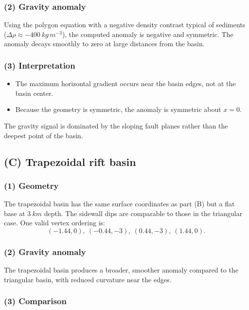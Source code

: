 \documentclass[11pt,a4paper]{article}
\begin{document}
\subsubsection*{(2) Gravity anomaly}

Using the polygon equation with a negative density contrast typical of sediments
($\Delta\rho \approx -400~\si{kg\,m^{-3}}$), the computed anomaly is negative and symmetric.
The anomaly decays smoothly to zero at large distances from the basin.

\subsubsection*{(3) Interpretation}

\begin{itemize}
    \item The maximum horizontal gradient occurs near the basin edges, not at the basin center.
    \item Because the geometry is symmetric, the anomaly is symmetric about $x=0$.
\end{itemize}

The gravity signal is dominated by the sloping fault planes rather than the deepest
point of the basin.

\subsection*{(C) Trapezoidal rift basin}

\subsubsection*{(1) Geometry}

The trapezoidal basin has the same surface coordinates as part (B) but a flat base
at $\SI{3}{km}$ depth. The sidewall dips are comparable to those in the triangular case.
One valid vertex ordering is:
\[
(-1.44,0),\ (-0.44,-3),\ (0.44,-3),\ (1.44,0).
\]

\subsubsection*{(2) Gravity anomaly}

The trapezoidal basin produces a broader, smoother anomaly compared to the triangular
basin, with reduced curvature near the edges.

\subsubsection*{(3) Comparison}
\end{document}
